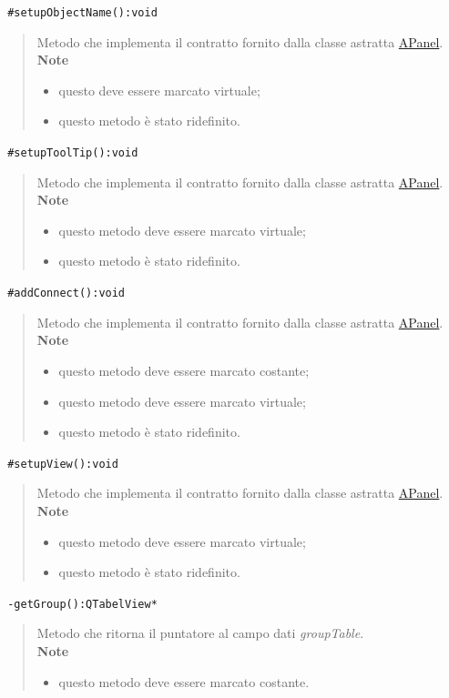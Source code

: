 \color{blue}\verb! #setupObjectName():void!
\begin{quote}
\color{black}Metodo che implementa il contratto fornito dalla classe astratta \hyperref[speAPanel]{APanel}.\\
 \textbf{Note}
 \begin{itemize}
  \item questo deve essere marcato virtuale;
 \item questo metodo è stato ridefinito.
 \end{itemize}
\end{quote} 
\color{blue}\verb! #setupToolTip():void!
\begin{quote}
\color{black}Metodo che implementa il contratto fornito dalla classe astratta \hyperref[speAPanel]{APanel}.\\
 \textbf{Note}
 \begin{itemize}
 \item questo metodo deve essere marcato virtuale;
 \item questo metodo è stato ridefinito.
 \end{itemize}
\end{quote} 
\color{blue}\verb! #addConnect():void!
\begin{quote}
\color{black}Metodo che implementa il contratto fornito dalla classe astratta \hyperref[speAPanel]{APanel}.\\
 \textbf{Note}
 \begin{itemize}
 \item questo metodo deve essere marcato costante;
 \item questo metodo deve essere marcato virtuale;
 \item questo metodo è stato ridefinito.
 \end{itemize}
\end{quote} 
\color{blue}\verb! #setupView():void!
\begin{quote}
\color{black}Metodo che implementa il contratto fornito dalla classe astratta \hyperref[speAPanel]{APanel}.\\
 \textbf{Note}
 \begin{itemize}
 \item questo metodo deve essere marcato virtuale;
 \item questo metodo è stato ridefinito.
 \end{itemize}
\end{quote}
\color{blue}\verb! -getGroup():QTabelView*!
\begin{quote}
\color{black}Metodo che ritorna il puntatore al campo dati \emph{groupTable}.\\
 \textbf{Note}
 \begin{itemize}
 \item questo metodo deve essere marcato costante.
 \end{itemize}
\end{quote}
